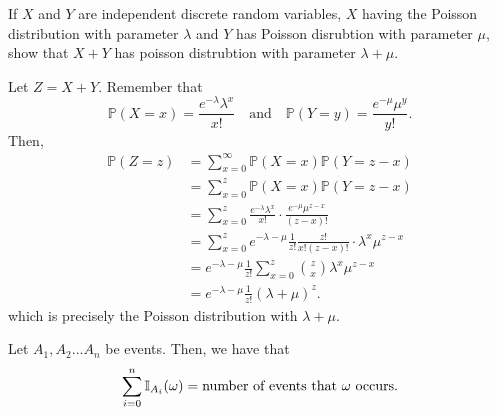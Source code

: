 \begin{eg}
	If \( X \) and \( Y \) are independent discrete random variables, \( X \) having the Poisson distribution with parameter \( \lambda  \) and \( Y \) has Poisson disrubtion with parameter \( \mu  \), show that \( X+Y \) has poisson distrubtion with parameter \( \lambda +\mu  \).
\end{eg}
\begin{explanation}
	Let \( Z=X+Y \). Remember that \[
		\mathbb{P}(X=x) = \frac{e^{-\lambda }\lambda ^{x}  }{x!} \quad \text{and} \quad \mathbb{P}(Y=y) = \frac{e^{-\mu }\mu ^{y}  }{y!}
	.\] Then, 
	\begin{align*}
		\mathbb{P}(Z=z) &= \sum_{x=0}^{\infty} \mathbb{P}(X=x)\mathbb{P}(Y=z-x)\\
		&= \sum_{x=0}^{z}\mathbb{P}(X=x)\mathbb{P}(Y=z-x)  \\
		&= \sum_{x=0}^{z}\frac{e^{-\lambda }\lambda ^{x}  }{x!}\cdot \frac{e^{-\mu }\mu ^{z-x}  }{(z-x)!}  \\
		&= \sum_{x=0}^{z} e^{-\lambda -\mu }\frac{1}{z!}\frac{z!}{x!(z-x)!} \cdot \lambda ^{x}\mu ^{z-x}   \\
		&= e^{-\lambda -\mu }\frac{1}{z!}\sum_{x=0}^{z} \binom{z}{x}\lambda ^{x}\mu ^{z-x}    \\
		&= e^{-\lambda -\mu }\frac{1}{z!}(\lambda +\mu )^{z}  
	.\end{align*}
	which is precisely the Poisson distribution with \( \lambda +\mu  \).
\end{explanation}

\begin{theorem}
	Let \( A_{1},A_{2}\ldots A_n \) be events. Then, we have that \[
		\sum_{i=0}^{n} \mathbb{I}_{A_i}(\omega ) = \text{number of events that \( \omega  \) occurs}
	.\] 
\end{theorem}

